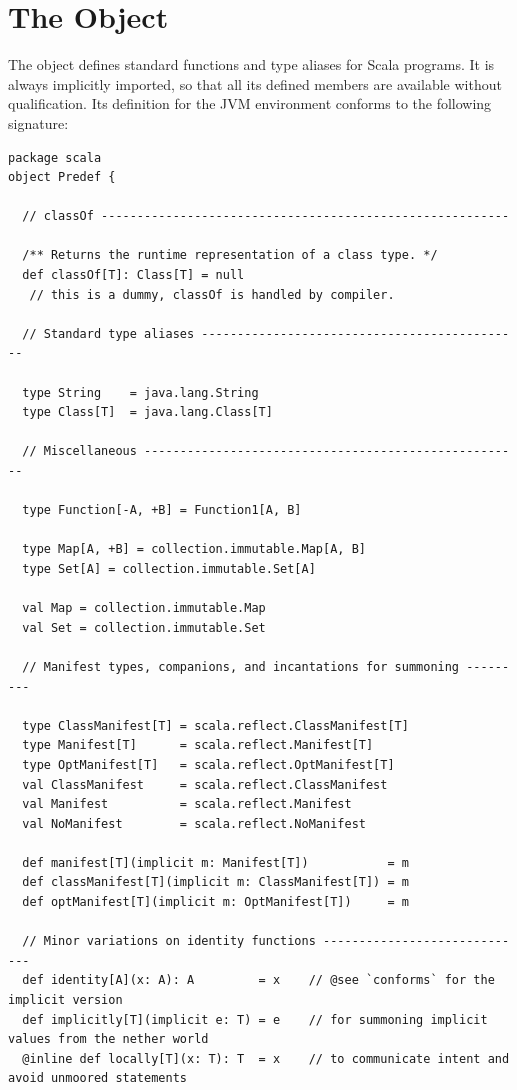 \newpage
\section{The \large{} Object}\label{cls:predef}

The  object defines standard functions and type aliases
for Scala programs. It is always implicitly imported, so that all its
defined members are available without qualification. Its definition
for the JVM environment conforms to the following signature:

\begin{lstlisting}
package scala
object Predef {

  // classOf ---------------------------------------------------------

  /** Returns the runtime representation of a class type. */
  def classOf[T]: Class[T] = null  
   // this is a dummy, classOf is handled by compiler.

  // Standard type aliases ---------------------------------------------

  type String    = java.lang.String
  type Class[T]  = java.lang.Class[T]

  // Miscellaneous -----------------------------------------------------
  
  type Function[-A, +B] = Function1[A, B]

  type Map[A, +B] = collection.immutable.Map[A, B]
  type Set[A] = collection.immutable.Set[A]

  val Map = collection.immutable.Map
  val Set = collection.immutable.Set

  // Manifest types, companions, and incantations for summoning ---------

  type ClassManifest[T] = scala.reflect.ClassManifest[T]
  type Manifest[T]      = scala.reflect.Manifest[T]
  type OptManifest[T]   = scala.reflect.OptManifest[T]
  val ClassManifest     = scala.reflect.ClassManifest
  val Manifest          = scala.reflect.Manifest
  val NoManifest        = scala.reflect.NoManifest
  
  def manifest[T](implicit m: Manifest[T])           = m
  def classManifest[T](implicit m: ClassManifest[T]) = m
  def optManifest[T](implicit m: OptManifest[T])     = m

  // Minor variations on identity functions -----------------------------
  def identity[A](x: A): A         = x    // @see `conforms` for the implicit version
  def implicitly[T](implicit e: T) = e    // for summoning implicit values from the nether world
  @inline def locally[T](x: T): T  = x    // to communicate intent and avoid unmoored statements


\end{lstlisting}
